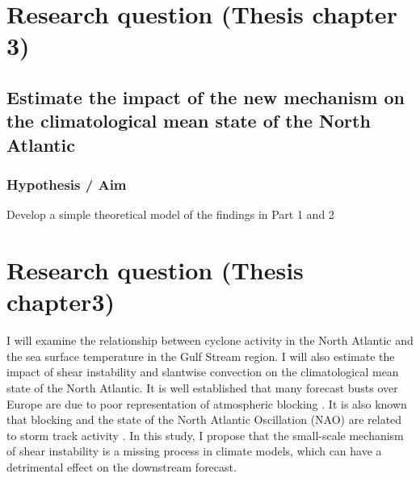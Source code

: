 
\chapter{Research question (Thesis chapter 3)}


%

\section{Estimate the impact of the new mechanism on the climatological mean state of the North Atlantic}

\subsection{ Hypothesis / Aim}
Develop a simple theoretical model of the findings in Part 1 and 2





\chapter {Research question (Thesis chapter3)} \label{Ch3}


I will examine the relationship between cyclone activity in the North Atlantic and the sea surface temperature in the Gulf Stream region. I will also estimate the impact of shear instability and slantwise convection on the climatological mean state of the North Atlantic. It is well established that many forecast busts over Europe are due to poor representation of atmospheric blocking \cite{rodwell2013characteristics}. It is also known that blocking and the state of the North Atlantic Oscillation (NAO) are related to storm track activity \citep{vallis2008local}. In this study, I propose that the small-scale mechanism of shear instability is a missing process in climate models, which can have a detrimental effect on the downstream forecast.

